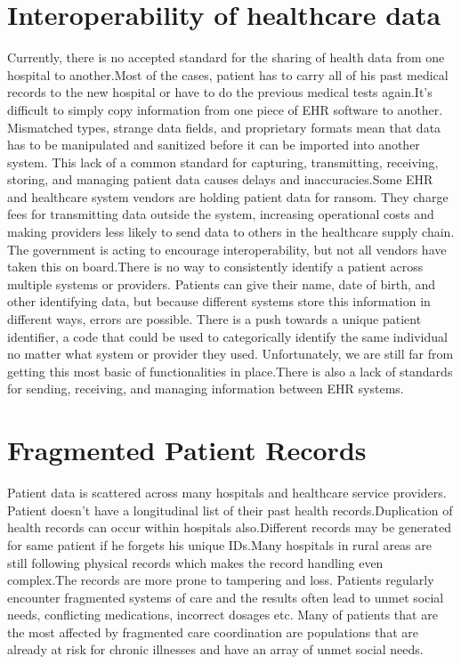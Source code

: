 \documentclass[12pt]{report}
\begin{document}
\section{Interoperability of healthcare data}
Currently, there is no accepted standard for the sharing of health data from one hospital to another.Most of the cases, patient has to carry all of his past medical records to the new hospital or have to do the previous medical tests again.It’s difficult to simply copy information from one piece of EHR software to another. Mismatched types, strange data fields, and proprietary formats mean that data has to be manipulated and sanitized before it can be imported into another system. This lack of a common standard for capturing, transmitting, receiving, storing, and managing patient data causes delays and inaccuracies.Some EHR and healthcare system vendors are holding patient data for ransom. They charge fees for transmitting data outside the system, increasing operational costs and making providers less likely to send data to others in the healthcare supply chain. The government is acting to encourage interoperability, but not all vendors have taken this on board.There is no way to consistently identify a patient across multiple systems or providers. Patients can give their name, date of birth, and other identifying data, but because different systems store this information in different ways, errors are possible. There is a push towards a unique patient identifier, a code that could be used to categorically identify the same individual no matter what system or provider they used. Unfortunately, we are still far from getting this most basic of functionalities in place.There is also a lack of standards for sending, receiving, and managing information between EHR systems.
\section{Fragmented Patient Records}
Patient data is scattered across many hospitals and healthcare service  providers. Patient doesn't have a longitudinal list of their past health records.Duplication of health records can occur within hospitals also.Different records may be generated for same patient if he forgets his unique IDs.Many hospitals in rural areas are still following physical records which makes the record handling even complex.The records are more prone to tampering and loss.
Patients regularly encounter fragmented systems of care and the results often lead to unmet social needs, conflicting medications, incorrect dosages etc. Many of patients that are the most affected by fragmented care coordination are populations that are already at risk for chronic illnesses and have an array of unmet social needs. 
\end{document}
